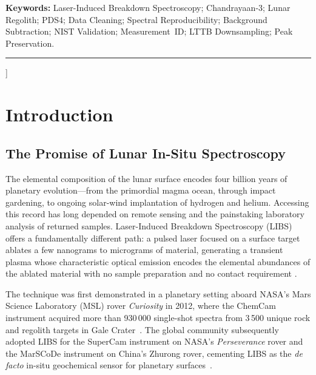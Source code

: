 \documentclass[a4paper,twocolumn,10pt]{article}
\begin{document}
{\begin{@twocolumnfalse}
\begin{abstract}
LunarAtlas further provides a PDS4-aware PostgreSQL schema,
\textbf{adaptive LTTB-based downsampling with explicit peak-union
guarantees}, and a versioned API with sub-\SI{500}{\milli\second}
response times.  By establishing a ``single source of scientific
truth,'' the system offers a replicable methodology for
Chandrayaan-4, Artemis-era VIPER, and Commercial Lunar Payload
Services (CLPS) LIBS instruments.
\end{abstract}
\vspace{4pt}
\noindent\textbf{Keywords:} Laser-Induced Breakdown Spectroscopy;
Chandrayaan-3; Lunar Regolith; PDS4; Data Cleaning; Spectral
Reproducibility; Background Subtraction; NIST Validation;
Measurement~ID; LTTB Downsampling; Peak Preservation.

\vspace{10pt}\hrule\vspace{12pt}
\end{@twocolumnfalse}
}]


\section{Introduction}
\label{sec:intro}

\subsection{The Promise of Lunar In-Situ Spectroscopy}

The elemental composition of the lunar surface encodes four billion
years of planetary evolution---from the primordial magma ocean, through
impact gardening, to ongoing solar-wind implantation of hydrogen and
helium.  Accessing this record has long depended on remote sensing and
the painstaking laboratory analysis of returned samples.  Laser-Induced
Breakdown Spectroscopy (LIBS) offers a fundamentally different path: a
pulsed laser focused on a surface target ablates a few nanograms to
micrograms of material, generating a transient plasma whose
characteristic optical emission encodes the elemental abundances of the
ablated material with no sample preparation and no contact requirement
\cite{Cremers2006,Wiens2012}.

The technique was first demonstrated in a planetary setting aboard
NASA's Mars Science Laboratory (MSL) rover \emph{Curiosity} in 2012,
where the ChemCam instrument acquired more than 930\,000 single-shot
spectra from 3\,500 unique rock and regolith targets in Gale
Crater~\cite{Wiens2012,Maurice2012,Gasnault2023}.  The global
community subsequently adopted LIBS for the SuperCam instrument on
NASA's \emph{Perseverance} rover and the MarSCoDe instrument on
China's Zhurong rover, cementing LIBS as the \emph{de facto} in-situ
geochemical sensor for planetary surfaces~\cite{Wiens2020,Xu2021}.
\end{document}
